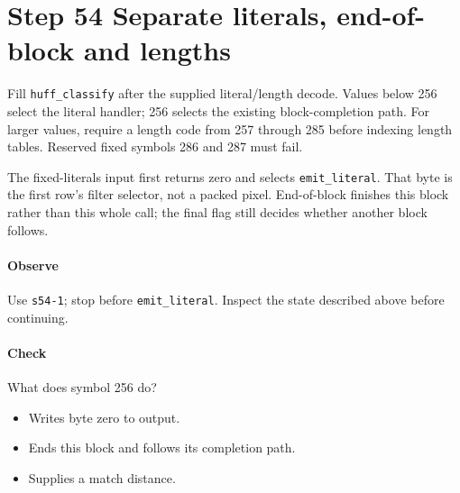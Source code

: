 \section{Step 54 Separate literals, end-of-block and lengths}\label{png-huff-s54}
Fill \texttt{huff\_classify} after the supplied literal/length decode. Values below 256 select the literal handler; 256 selects the existing block-completion path. For larger values, require a length code from 257 through 285 before indexing length tables. Reserved fixed symbols 286 and 287 must fail.

The fixed-literals input first returns zero and selects \texttt{emit\_literal}. That byte is the first row's filter selector, not a packed pixel. End-of-block finishes this block rather than this whole call; the final flag still decides whether another block follows.

\paragraph{Observe} Use \texttt{s54-1}; stop before \texttt{emit\_literal}. Inspect the state described above before continuing.

\paragraph{Check} What does symbol 256 do?
\begin{itemize}
\item[A.] Writes byte zero to output.
\item[B.] Ends this block and follows its completion path.
\item[C.] Supplies a match distance.
\end{itemize}
